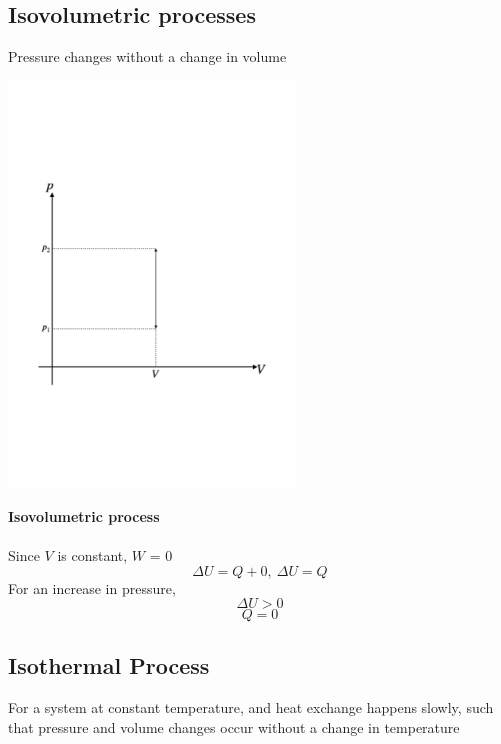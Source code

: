\documentclass[a4paper, 10pt]{article}
\begin{document}
\subsection{Isovolumetric processes}
Pressure changes without a change in volume \\
\begin{minipage}{0.5\textwidth}
      \includegraphics[trim = 50 50 50 50, width=3in]{figures/isovolumetric_process.pdf} 
\end{minipage}	
\begin{minipage}{0.5\textwidth}
   \textbf{Isovolumetric process} \\ \\

   Since $V$ is constant, $W$ = 0
   \[
   \Delta U = Q + 0,\ \Delta U = Q
   \]
   For an increase in pressure, 
   \[
   \Delta U > 0
   \]
   \[
   Q = 0
   \]
\end{minipage}	

\subsection{Isothermal Process}
For a system at constant temperature, and heat exchange happens slowly, such that pressure and volume changes occur without a change in temperature \\
\end{document}
